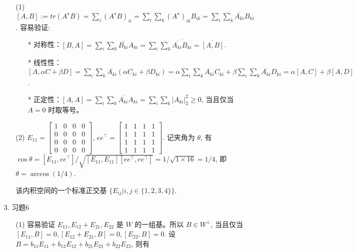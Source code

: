 \documentclass{article}
\begin{document}
\begin{itemize}
    \begin{itemize}
        \item [(1)] $[A, B]:= tr(A^\star B) = \sum_{i} (A^\star B)_{ii} = \sum_{i}\sum_{k} (A^\star)_{ik}B_{ik} = \sum_i\sum_k \overline{A_{ki}}B_{ki}$. 容易验证: 
        \begin{itemize}
            \item [*] 对称性：$[B, A] = \sum_{i}\sum_{k} \overline{B_{ki}}A_{ki} = \sum_i\sum_k \overline{\overline{A_{ki}}B_{ki}} = \overline {[A, B]}$.
            \item [*] 线性性：$[A, \alpha C+ \beta D] = \sum_i\sum_k \overline{A_{ki}}(\alpha C_{ki} + \beta D_{ki}) = \alpha \sum_i\sum_k \overline{A_{ki}}C_{ki} + \beta\sum_i\sum_k \overline{A_{ki}}D_{ki} = \alpha [A, C] + \beta [A, D]$.
            \item [*] 正定性：$[A, A] = \sum_i\sum_k \overline{A_{ki}}A_{ki} = \sum_i\sum_k |A_{ki}|_2^2 \geq 0$, 当且仅当 $A = 0$ 时取等号。
        \end{itemize}
        \item [(2)] $E_{11} = \left[\begin{array}{cccc}1&0&0&0\\0&0&0&0\\0&0&0&0\\0&0&0&0\end{array}\right]$, $ee^\top = \left[\begin{array}{cccc}1&1&1&1\\1&1&1&1\\1&1&1&1\\1&1&1&1\end{array}\right]$. 记夹角为 $\theta$, 有 $\cos \theta = [E_{11}, ee^\top] / \sqrt{[E_{11}, E_{11}][ee^\top, ee^\top]} = 1 / \sqrt{1\times 16} = 1/4$, 即 $\theta = \arccos (1/4)$.
        
        该内积空间的一个标准正交基 $\{E_{ij} | i, j\in\{1,2,3,4\}\}$.
    \end{itemize}

    \item[3.] 习题6
    
    \begin{itemize}
        \item [(1)] 容易验证 $E_{11}, E_{12} + E_{21}, E_{22}$ 是 $W$ 的一组基。所以 $B \in W^\perp$, 当且仅当 $[E_{11}, B] = 0, [E_{12} + E_{21}, B] = 0, [E_{22}, B] = 0$. 设 $B = b_{11}E_{11} + b_{12}E_{12} + b_{21}E_{21} + b_{22}E_{22}$, 则有 
        

\end{itemize}
\end{itemize}
\end{document}
